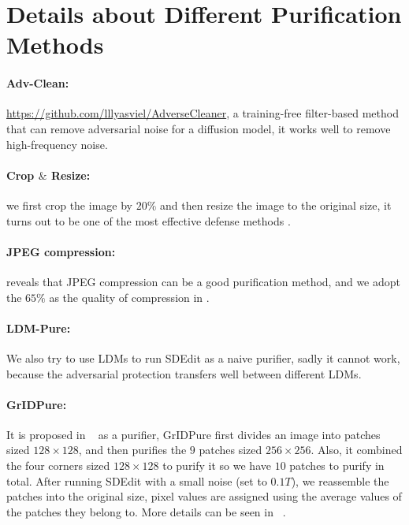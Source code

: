 \section{Details about Different Purification Methods}\label{supp:section:purification_baselines}


\paragraph{Adv-Clean:} \url{https://github.com/lllyasviel/AdverseCleaner}, a training-free filter-based method that can remove adversarial noise for a diffusion model, it works well to remove high-frequency noise.

\paragraph{Crop $\&$ Resize:} we first crop the image by $20\%$ and then resize the image to the original size, it turns out to be one of the most effective defense methods \citep{liang2023mist}.

\paragraph{JPEG compression:} \citep{sandoval2023jpeg} reveals that JPEG compression can be a good purification method, and we adopt the $65\%$ as the quality of compression in \citep{sandoval2023jpeg}.

\paragraph{LDM-Pure:} We also try to use LDMs to run SDEdit as a naive purifier, sadly it cannot work, because the adversarial protection transfers well between different LDMs.

\paragraph{GrIDPure:} It is proposed in ~\cite{zhao2023can} as a purifier, GrIDPure first divides an image into patches sized $128\times 128$, and then purifies the $9$ patches sized $256\times 256$. Also, it combined the four corners sized $128\times 128$ to purify it so we have $10$ patches to purify in total. After running SDEdit with a small noise (set to $0.1 T$), we reassemble the patches into the original size, pixel values are assigned using the average values of the patches they belong to. More details can be seen in ~\cite{zhao2023can}.


